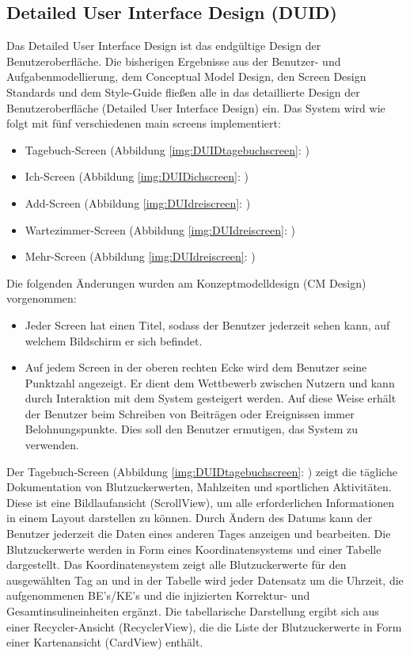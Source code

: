 \subsection{Detailed User Interface Design (DUID)}
	Das Detailed User Interface Design ist das endgültige Design der Benutzeroberfläche. Die bisherigen Ergebnisse aus der Benutzer- und Aufgabenmodellierung, dem Conceptual Model Design, den Screen Design Standards und dem Style-Guide fließen alle in das detaillierte Design der Benutzeroberfläche (Detailed User Interface Design) ein.\newline
	Das System wird wie folgt mit fünf verschiedenen main screens implementiert:
\begin{itemize}
	\item Tagebuch-Screen (Abbildung \ref{img:DUIDtagebuchscreen}: \glqq {}\grqq{})
	\item Ich-Screen (Abbildung \ref{img:DUIDichscreen}: \glqq {}\grqq{})
	\item Add-Screen (Abbildung \ref{img:DUIdreiscreen}: \glqq {}\grqq{})
	\item Wartezimmer-Screen (Abbildung \ref{img:DUIdreiscreen}: \glqq {}\grqq{})
	\item Mehr-Screen (Abbildung \ref{img:DUIdreiscreen}: \glqq {}\grqq{})
\end{itemize}
Die folgenden Änderungen wurden am Konzeptmodelldesign (CM Design) vorgenommen:
\begin{itemize}
	\item Jeder Screen hat einen Titel, sodass der Benutzer jederzeit sehen kann, auf welchem Bildschirm er sich befindet.
	\item Auf jedem Screen in der oberen rechten Ecke wird dem Benutzer seine Punktzahl angezeigt. Er dient dem Wettbewerb zwischen Nutzern und kann durch Interaktion mit dem System gesteigert werden. Auf diese Weise erhält der Benutzer beim Schreiben von Beiträgen oder Ereignissen immer Belohnungspunkte. Dies soll den Benutzer ermutigen, das System zu verwenden.
\end{itemize}
	Der Tagebuch-Screen (Abbildung \ref{img:DUIDtagebuchscreen}: \glqq {}\grqq{}) zeigt die tägliche Dokumentation von Blutzuckerwerten, Mahlzeiten und sportlichen Aktivitäten. Diese ist eine Bildlaufansicht (ScrollView), um alle erforderlichen Informationen in einem Layout darstellen zu können. Durch Ändern des Datums kann der Benutzer jederzeit die Daten eines anderen Tages anzeigen und bearbeiten. Die Blutzuckerwerte werden in Form eines Koordinatensystems und einer Tabelle dargestellt. Das Koordinatensystem zeigt alle Blutzuckerwerte für den ausgewählten Tag an und in der Tabelle wird jeder Datensatz um die Uhrzeit, die aufgenommenen BE's/KE's und die injizierten Korrektur- und Gesamtinsulineinheiten ergänzt. Die tabellarische Darstellung ergibt sich aus einer Recycler-Ansicht (RecyclerView), die die Liste der Blutzuckerwerte in Form einer Kartenansicht (CardView) enthält.\newline
